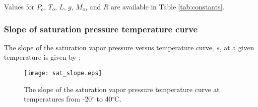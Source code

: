 \noindent Values for $P_o$, $T_o$, $L$, $g$, $M_a$, and $R$ are available in Table \ref{tab:constants}.

\subsubsection{Slope of saturation pressure temperature curve}
\label{sec:sat}
The slope of the saturation vapor pressure versus temperature curve, $s$, at a given temperature is given by \parencite[Eq. 13]{allen98}:

\begin{figure}[ht!]
    \texttt{[image: sat\_slope.eps]}
    \caption{The slope of the saturation vapor pressure temperature curve at temperatures from -20$^{\circ}$ to 40$^{\circ}$C.}
    \label{fig:sat}
\end{figure}

